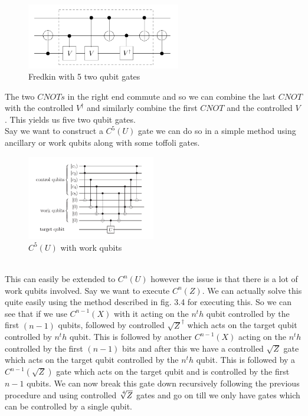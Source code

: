 \documentclass{report}
\begin{document}
\begin{figure}[ht]
\centering
\includegraphics[width = 0.6\textwidth]{images/fredkin with 5 gates.png}
\caption{Fredkin with 5 two qubit gates}
\end{figure}
The two $CNOTs$ in the right end commute and so we can combine the last $CNOT$ with the controlled $V^{\dagger}$ and similarly combine the first $CNOT$ and the controlled $V$. This yields us five two qubit gates.\\
Say we want to construct a $C^5(U)$ gate we can do so in a simple method using ancillary or work qubits along with some toffoli gates.\\
\begin{figure}[ht]
\centering
\includegraphics[width = 0.5\textwidth]{images/c5u.png}
\caption{$C^5(U)$ with work qubits}
\end{figure}\\
This can easily be extended to $C^n(U)$ however the issue is that there is a lot of work qubits involved. Say we want to execute $C^n(Z)$.
We can actually solve this quite easily using the method described in fig. 3.4 for executing this. So we can see that if we use $C^{n-1}(X)$ with it acting on the $n^th$ qubit controlled by the first $(n-1)$ qubits, followed by controlled $\sqrt{Z}^{\dagger}$ which acts on the target qubit controlled by $n^th$ qubit. 
This is followed by another $C^{n-1}(X)$  acting on the $n^th$ controlled by the first $(n-1)$ bits and after this we have a controlled $\sqrt{Z}$ gate which acts on the target qubit controlled by the $n^th$ qubit. This is followed by a $C^{n-1}(\sqrt{Z})$ gate which acts on the target qubit and is controlled by the first $n-1$ qubits. We can now break this gate down recursively following the previous procedure and using controlled $\sqrt[\leftroot{-1}\uproot{1}4]{Z}$ gates and go on till we only have gates which can be controlled by a single qubit.\\
\end{document}
